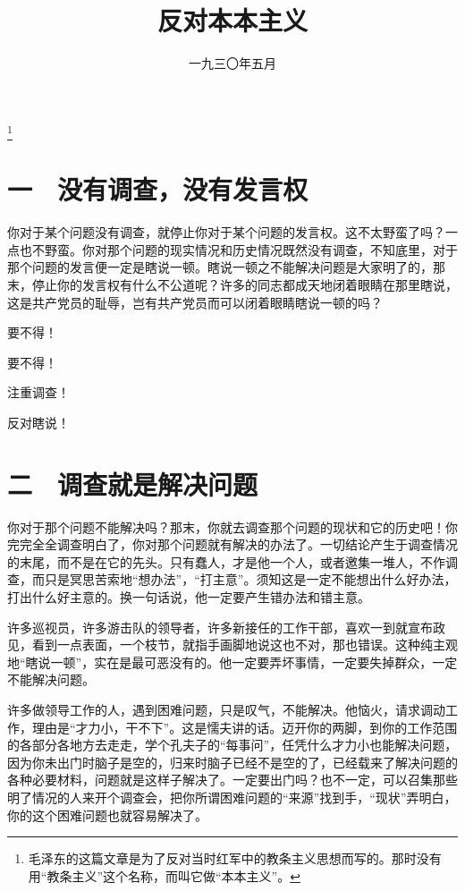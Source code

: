 
\title{反对本本主义}
\date{一九三〇年五月}
\thanks{毛泽东的这篇文章是为了反对当时红军中的教条主义思想而写的。那时没有用“教条主义”这个名称，而叫它做“本本主义”。}
\maketitle


\section{一　没有调查，没有发言权}

你对于某个问题没有调查，就停止你对于某个问题的发言权。这不太野蛮了吗？一点也不野蛮。你对那个问题的现实情况和历史情况既然没有调查，不知底里，对于那个问题的发言便一定是瞎说一顿。瞎说一顿之不能解决问题是大家明了的，那末，停止你的发言权有什么不公道呢？许多的同志都成天地闭着眼睛在那里瞎说，这是共产党员的耻辱，岂有共产党员而可以闭着眼睛瞎说一顿的吗？

要不得！

要不得！

注重调查！

反对瞎说！

\section{二　调查就是解决问题}

你对于那个问题不能解决吗？那末，你就去调查那个问题的现状和它的历史吧！你完完全全调查明白了，你对那个问题就有解决的办法了。一切结论产生于调查情况的末尾，而不是在它的先头。只有蠢人，才是他一个人，或者邀集一堆人，不作调查，而只是冥思苦索地“想办法”，“打主意”。须知这是一定不能想出什么好办法，打出什么好主意的。换一句话说，他一定要产生错办法和错主意。

许多巡视员，许多游击队的领导者，许多新接任的工作干部，喜欢一到就宣布政见，看到一点表面，一个枝节，就指手画脚地说这也不对，那也错误。这种纯主观地“瞎说一顿”，实在是最可恶没有的。他一定要弄坏事情，一定要失掉群众，一定不能解决问题。

许多做领导工作的人，遇到困难问题，只是叹气，不能解决。他恼火，请求调动工作，理由是“才力小，干不下”。这是懦夫讲的话。迈开你的两脚，到你的工作范围的各部分各地方去走走，学个孔夫子的“每事问”，任凭什么才力小也能解决问题，因为你未出门时脑子是空的，归来时脑子已经不是空的了，已经载来了解决问题的各种必要材料，问题就是这样子解决了。一定要出门吗？也不一定，可以召集那些明了情况的人来开个调查会，把你所谓困难问题的“来源”找到手，“现状”弄明白，你的这个困难问题也就容易解决了。

